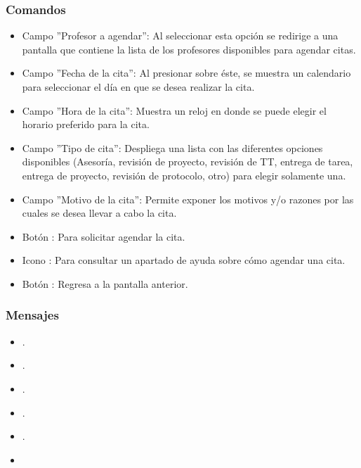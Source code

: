 \subsubsection{Comandos}
	\begin{itemize}
		\item Campo ''Profesor a agendar'': Al seleccionar esta opción se redirige a una pantalla que contiene la lista de los profesores disponibles para agendar citas.
		\item Campo ''Fecha de la cita'': Al presionar sobre éste, se muestra un calendario para seleccionar el día en que se desea realizar la cita.
		\item Campo ''Hora de la cita'': Muestra un reloj en donde se puede elegir el horario preferido para la cita.	
		\item Campo ''Tipo de cita'': Despliega una lista con las diferentes opciones disponibles (Asesoría, revisión de proyecto, revisión de TT, entrega de tarea, entrega de proyecto, revisión de protocolo, otro) para elegir solamente una. 
		\item Campo ''Motivo de la cita'': Permite exponer los motivos y/o razones por las cuales se desea llevar a cabo la cita.	
		\item Botón : Para solicitar agendar la cita.
		\item Icono : Para consultar un apartado de ayuda sobre cómo agendar una cita.
		\item Botón : Regresa a la pantalla anterior.
	\end{itemize}

\subsubsection{Mensajes}
	\begin{itemize}
		\item {}.
		\item {}.
		\item {}.
		\item {}.
		\item {}.
		\item {}
	\end{itemize}

